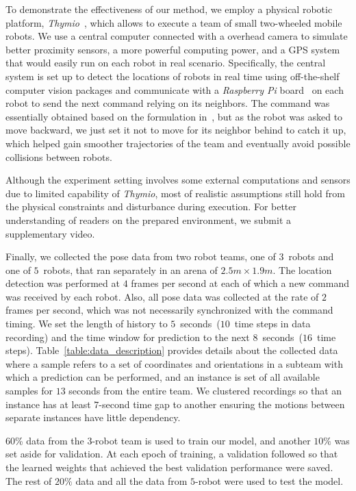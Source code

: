 \documentclass[letterpaper, 10 pt, conference]{ieeeconf}  %
\begin{document}
    To demonstrate the effectiveness of our method, we employ a physical
    robotic platform, \emph{Thymio}~\cite{Shin14}, which allows to
    execute a team of small two-wheeled mobile robots. We use a central
    computer connected with a overhead camera to simulate better
    proximity sensors, a more powerful computing power, and a GPS system
    that would easily run on each robot in real scenario. Specifically,
    the central system is set up to detect the locations of robots in
    real time using off-the-shelf computer vision packages and
    communicate with a \emph{Raspberry Pi} board~\cite{Upton14} on each
    robot to send the next command relying on its neighbors. The command
    was essentially obtained based on the formulation in~\cite{CPR17},
    but as the robot was asked to move backward, we just set it not to
    move for its neighbor behind to catch it up, which helped gain
    smoother trajectories of the team and eventually avoid possible
    collisions between robots.

    Although the experiment setting involves some external computations
    and sensors due to limited capability of \emph{Thymio}, most of
    realistic assumptions still hold from the physical constraints and
    disturbance during execution. For better understanding of readers on
    the prepared environment, we submit a supplementary video.

    Finally, we collected the pose data from two robot teams, one of
    $3$~robots and one of $5$~robots, that ran separately in an arena of
    $2.5 m \times 1.9 m$. The location detection was performed at $4$
    frames per second at each of which a new command was received by
    each robot. Also, all pose data was collected at the rate of $2$
    frames per second, which was not necessarily synchronized with the
    command timing. We set the length of history to
    $5$~seconds~($10$~time steps in data recording) and the time window
    for prediction to the next $8$~seconds~($16$~time steps).
    Table~\ref{table:data_description} provides details about the
    collected data where a sample refers to a set of coordinates and
    orientations in a subteam with which a prediction can be performed,
    and an instance is set of all available samples for $13$ seconds
    from the entire team. We clustered recordings so that an instance
    has at least $7$-second time gap to another ensuring the motions
    between separate instances have little dependency.

    $60$\% data from the $3$-robot team is used to train our model, and
    another $10\%$ was set aside for validation. At each epoch of
    training, a validation followed so that the learned weights that
    achieved the best validation performance were saved. The rest of
    $20\%$ data and all the data from $5$-robot were used to test the
    model.
\end{document}
